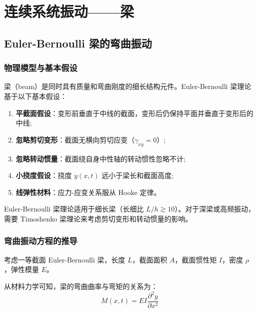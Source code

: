 
\chapter{连续系统振动——梁}


\section{Euler-Bernoulli 梁的弯曲振动}

\subsection{物理模型与基本假设}

梁（beam）是同时具有质量和弯曲刚度的细长结构元件。Euler-Bernoulli 梁理论基于以下基本假设：

\begin{enumerate}
    \item \textbf{平截面假设}：变形前垂直于中线的截面，变形后仍保持平面并垂直于变形后的中线;
    \item \textbf{忽略剪切变形}：截面无横向剪切应变（$\gamma_{xy}=0$）;
    \item \textbf{忽略转动惯量}：截面绕自身中性轴的转动惯性忽略不计;
    \item \textbf{小挠度假设}：挠度 $y(x,t)$ 远小于梁长和截面高度;
    \item \textbf{线弹性材料}：应力-应变关系服从 Hooke 定律。
\end{enumerate}

\begin{remark}
Euler-Bernoulli 梁理论适用于细长梁（长细比 $L/h \gtrsim 10$）。对于深梁或高频振动，需要 Timoshenko 梁理论来考虑剪切变形和转动惯量的影响。
\end{remark}

\subsection{弯曲振动方程的推导}

考虑一等截面 Euler-Bernoulli 梁，长度 $L$，截面面积 $A$，截面惯性矩 $I$，密度 $\rho$，弹性模量 $E$。

从材料力学可知，梁的弯曲曲率与弯矩的关系为：
\[
M(x,t) = EI \frac{\partial^2 y}{\partial x^2}
\]

